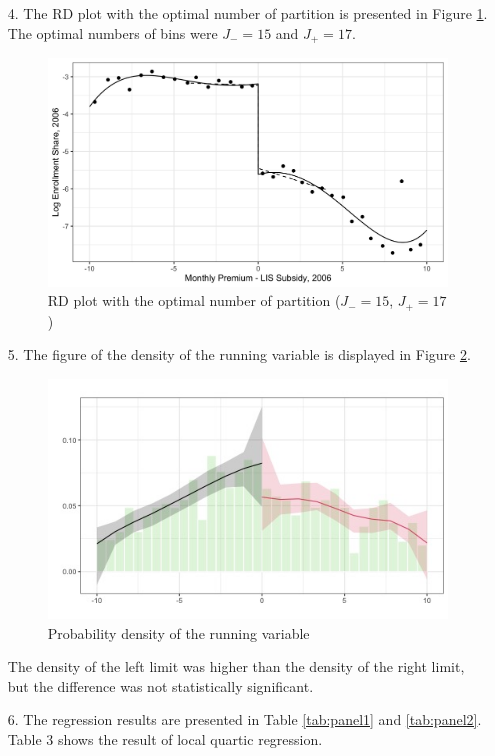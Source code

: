 \documentclass[12pt]{article}
\begin{document}
\begin{itemize}
\item[4.] The RD plot with the optimal number of partition is presented in Figure \ref{fig:binopt}. The optimal numbers of bins were $J_-=15$ and $J_+=17$.
\begin{figure} [ht]
	\centering
	\includegraphics[scale=0.15]{../output/fig_binopt.jpg}
	\caption{RD plot with the optimal number of partition ($J_-=15$, $J_+=17$)}
	\label{fig:binopt}
\end{figure}

\item[5.] The figure of the density of the running variable is displayed in Figure \ref{fig:density}.
\begin{figure}
	\centering
	\includegraphics[scale=0.8]{../output/fig_density.jpg}
	\caption{Probability density of the running variable}
	\label{fig:density}
\end{figure}
The density of the left limit was higher than the density of the right limit, but the difference was not statistically significant.

\item[6.] The regression results are presented in Table \ref{tab:panel1} and \ref{tab:panel2}. Table 3 shows the result of local quartic regression.




\end{itemize}
\end{document}
